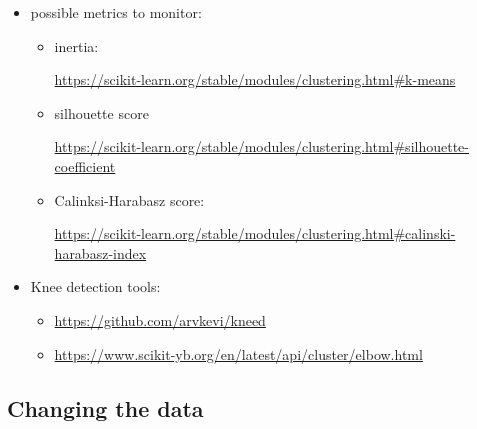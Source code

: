 \documentclass[
10pt, %
a4paper, %
oneside, %
headinclude,footinclude, %
BCOR5mm, %
]{scrartcl}
\begin{document}
{\color{Purple}{Experiment with the following heuristics, metrics and tools in order to
obtain a suggested number of clusters:}}
\begin{itemize}
    \item possible metrics to monitor: 
        \begin{itemize}
            \item inertia:

                \url{https://scikit-learn.org/stable/modules/clustering.html#k-means} 
            \item silhouette score

                \url{https://scikit-learn.org/stable/modules/clustering.html#silhouette-coefficient} 

            \item Calinksi-Harabasz score:
                
                \url{https://scikit-learn.org/stable/modules/clustering.html#calinski-harabasz-index} 
        \end{itemize}
    \item Knee detection tools:
        \begin{itemize}
            \item \url{https://github.com/arvkevi/kneed} 
                \item \url{https://www.scikit-yb.org/en/latest/api/cluster/elbow.html} 
        \end{itemize}
\end{itemize}

\subsection{Changing the data}

{\color{Purple}{You can generate the data again in order to study the behavior
of the previous heuristics on a dataset with different statistical properties.}}
\end{document}
